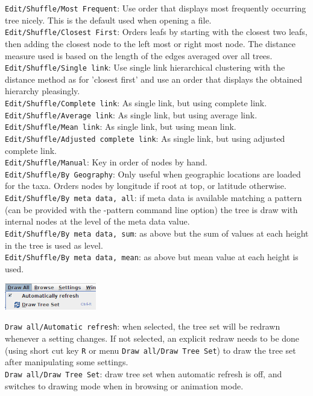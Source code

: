 \documentclass{article}
\begin{document}
{\tt Edit/Shuffle/Most Frequent}: Use order that displays most frequently occurring tree nicely. 
This is the default used when opening a file.\\
{\tt Edit/Shuffle/Closest First}: Orders leafs by starting with the closest two leafs, then
adding the closest node to the left most or right most node. The distance measure used is
based on the length of the edges averaged over all trees.\\
{\tt Edit/Shuffle/Single link}: Use single link hierarchical clustering with the distance method
as for 'closest first' and use an order that displays the obtained hierarchy pleasingly.\\
{\tt Edit/Shuffle/Complete link}: As single link, but using complete link.\\
{\tt Edit/Shuffle/Average link}: As single link, but using average link.\\
{\tt Edit/Shuffle/Mean link}: As single link, but using mean link.\\
{\tt Edit/Shuffle/Adjusted complete link}: As single link, but using adjusted complete link.\\
{\tt Edit/Shuffle/Manual}: Key in order of nodes by hand.\\
{\tt Edit/Shuffle/By Geography}: Only useful when geographic locations are loaded for the taxa.
Orders nodes by longitude if root at top, or latitude otherwise.\\
{\tt Edit/Shuffle/By meta data, all}: if meta data is available matching a pattern (can be
provided with the -pattern command line option) the tree is draw with internal nodes at
the level of the meta data value.\\
{\tt Edit/Shuffle/By meta data, sum}: as above but the sum of values at each height in the
tree is used as level.\\
{\tt Edit/Shuffle/By meta data, mean}: as above but mean value at each height is used.\\


\begin{center}
\includegraphics[width=4cm]{menudrawall.png}
\end{center}

\noindent
{\tt Draw all/Automatic refresh}: when selected, the tree set will be redrawn whenever a setting
changes. If not selected, an explicit redraw needs to be done (using short cut key {\tt R} or 
menu {\tt Draw all/Draw Tree Set}) to draw the tree set after manipulating some settings.\\
{\tt Draw all/Draw Tree Set}: draw tree set when automatic refresh is off, and switches to
drawing mode when in browsing or animation mode.
\end{document}
